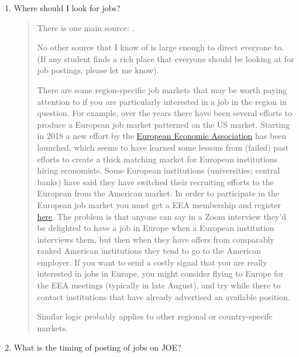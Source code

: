 \documentclass{\classes/econtex}
\begin{document}
\begin{enumerate}
\item  Where should I look for jobs? 

  \begin{quote}
    There is one main source: \JOE.

    No other source that I know of is large enough to direct everyone to. (If any student finds a rich place that everyone should be looking at for job postings, please let me know).

    \hypertarget{Region-Specific-Job-Markets}{}
    
    There are some region-specific job markets that may be worth paying attention to if you are particularly interested in a job in the region in question.  For example, over the years there have been several efforts to produce a European job market patterned on the US market.  Starting in 2018 a new effort by the \href{https://www.eeassoc.org/}{European Economic Association} has been launched, which seems to have learned some lessons from (failed) past efforts to create a thick matching market for European institutions hiring economists. Some European institutions (universities; central banks) have said they have switched their recruiting efforts to the European from the American market.  In order to participate in the European job market you must get a EEA membership and register \href{https://www.europeanjobmarketofeconomists.org/}{here}.  The problem is that anyone can say in a Zoom interview they'd be delighted to have a job in Europe when a European institution interviews them, but then when they have offers from comparably ranked American institutions they tend to go to the American employer.  If you want to send a costly signal that you are really interested in jobs in Europe, you might consider flying to Europe for the EEA meetings (typically in late August), and try while there to contact institutions that have already advertised an available position.
 
    Similar logic probably applies to other regional or country-specifc markets.
  \end{quote}
  
\item What is the timing of posting of jobs on JOE? 


\end{enumerate}
\end{document}
